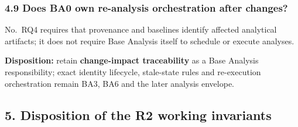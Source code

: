 \documentclass[
  10pt,
]{article}
\begin{document}
\subsubsection{4.9 Does BA0 own re-analysis orchestration after
changes?}\label{does-ba0-own-re-analysis-orchestration-after-changes}

No.~RQ4 requires that provenance and baselines identify affected
analytical artifacts; it does not require Base Analysis itself to
schedule or execute analyses.

\textbf{Disposition:} retain \textbf{change-impact traceability} as a
Base Analysis responsibility; exact identity lifecycle, stale-state
rules and re-execution orchestration remain BA3, BA6 and the later
analysis envelope.

\subsection{5. Disposition of the R2 working
invariants}\label{disposition-of-the-r2-working-invariants}
\end{document}
